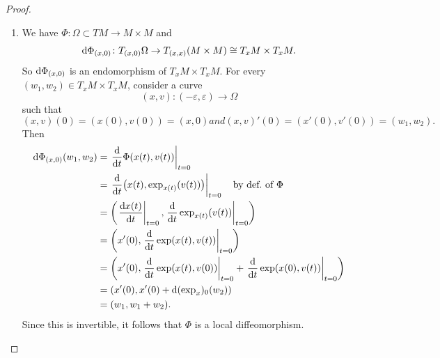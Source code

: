 \begin{proof}
\begin{enumerate}
Now, we're ready! Then we have
\begin{subequations}
  \begin{align}
\D(\exp_{x})_{0}(v) &= \left.\frac{\D}{\D s}\exp_{x}(sv)\right|_{s=0}\\
&=\left.\frac{\D}{\D s}\gamma_{x,sv}(1)\right|_{s=0}\\
&=\left.\frac{\D}{\D s}\alpha_{x,v,s}(1)\right|_{s=0}\\
&=\left.\frac{\D}{\D s}\gamma_{x,v}(s)\right|_{s=0}\\
&=\gamma'_{x,v}(0)=v.
  \end{align}
\end{subequations}
Hence $\D(\exp_{x})_{0}$ is the identity.
\item We have $\Phi\colon\Omega\subset TM\to M\times M$ and
\begin{equation}
\mathrm{d}\Phi_{(x,0)}\colon T_{(x,0)}\Omega\to T_{(x,x)}(M\times M)\cong T_{x}M\times T_{x}M.
\end{equation}
So $\mathrm{d}\Phi_{(x,0)}$ is an endomorphism of $T_{x}M\times T_{x}M$. For
every $(w_{1},w_{2})\in T_{x}M\times T_{x}M$, consider a curve
\begin{equation}
(x,v)\colon(-\varepsilon,\varepsilon)\to\Omega
\end{equation}
such that
\begin{subequations}
\begin{equation}
(x,v)(0)=(x(0),v(0))=(x,0)
\end{equation}
and
\begin{equation}
(x,v)'(0)=(x'(0),v'(0))=(w_{1},w_{2}).
\end{equation}
\end{subequations}
Then
\begin{subequations}
  \begin{align}
\mathrm{d}\Phi_{(x,0)}(w_{1},w_{2})
&=\left.\frac{\mathrm{d}}{\mathrm{d} t}\Phi(x(t),v(t))\right|_{t=0}\\
&=\left.\frac{\mathrm{d}}{\mathrm{d} t}\bigl(x(t),\exp_{x(t)}(v(t))\bigr)\right|_{t=0}\quad\mbox{by def.~of }\Phi\\
&=\left(\left.\frac{\mathrm{d} x(t)}{\mathrm{d} t}\right|_{t=0},\left.\frac{\mathrm{d}}{\mathrm{d} t}\exp_{x(t)}(v(t))\right|_{t=0}\right)\\
&=\left(x'(0),\left.\frac{\mathrm{d}}{\mathrm{d} t}\exp(x(t),v(t))\right|_{t=0}\right)\\
&=\left(x'(0),\left.\frac{\mathrm{d}}{\mathrm{d} t}\exp(x(t),v(0))\right|_{t=0}+\left.\frac{\mathrm{d}}{\mathrm{d} t}\exp(x(0),v(t))\right|_{t=0}\right)\\
&=(x'(0),x'(0)+\mathrm{d}(\exp_{x})_{0}(w_{2}))\\
&=(w_{1},w_{1}+w_{2}).
  \end{align}
\end{subequations}
Since this is invertible, it follows that $\Phi$ is a local diffeomorphism.
  \qedhere
\end{enumerate}
\end{proof}

